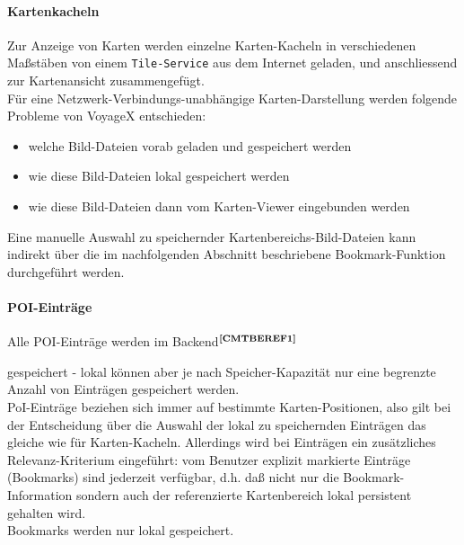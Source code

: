 \paragraph{Kartenkacheln}
Zur Anzeige von Karten werden einzelne Karten-Kacheln in verschiedenen Maßstäben von einem \texttt{Tile-Service} aus dem Internet geladen, und anschliessend zur Kartenansicht zusammengefügt.\\
Für eine Netzwerk-Verbindungs-unabhängige Karten-Darstellung werden folgende Probleme von VoyageX entschieden: 
	\begin{itemize}
		\item welche Bild-Dateien vorab geladen und gespeichert werden%
		\item wie diese Bild-Dateien lokal gespeichert werden%
		\item wie diese Bild-Dateien dann vom Karten-Viewer eingebunden werden%
	\end{itemize}
Eine manuelle Auswahl zu speichernder Kartenbereichs-Bild-Dateien kann indirekt über die im nachfolgenden Abschnitt beschriebene Bookmark-Funktion durchgeführt werden.

\paragraph{POI-Einträge}
Alle POI-Einträge werden im Backend$^{\textbf{\ref{CMTBEREF1}}}$%
\addtocounter{footnote}{1}%
 gespeichert - lokal können aber je nach Speicher-Kapazität nur eine begrenzte Anzahl von Einträgen gespeichert werden.\\ PoI-Einträge beziehen sich immer auf bestimmte Karten-Positionen, also gilt bei der Entscheidung über die Auswahl der lokal zu speichernden Einträgen das gleiche wie für Karten-Kacheln.
Allerdings wird bei Einträgen ein zusätzliches Relevanz-Kriterium eingeführt: vom Benutzer explizit markierte Einträge (Bookmarks) sind jederzeit verfügbar, d.h. daß nicht nur die Bookmark-Information sondern auch der referenzierte Kartenbereich lokal persistent gehalten wird.\\
Bookmarks werden nur lokal gespeichert.

